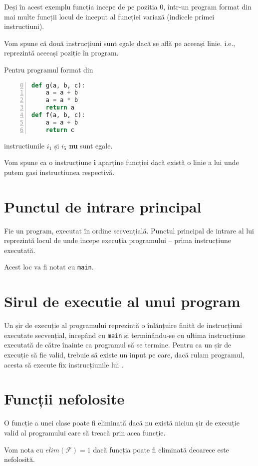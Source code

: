 Deși în acest exemplu funcția  incepe de pe pozitia 0,
într-un program format din mai multe funcții locul de inceput al
funcției variază (indicele primei instructiuni).

Vom spune că două instrucțiuni sunt egale dacă se află pe aceeași
linie. i.e., reprezintă aceeași poziție în program.

Pentru programul format din
\begin{lstlisting}[language=Python, numbers=left, firstnumber=0]
def g(a, b, c):
    a = a + b
    a = a * b
    return a
def f(a, b, c):
    a = a + b
    return c
\end{lstlisting}
instructiunile $i_1$ și $i_5$ \textbf{nu} sunt egale.

Vom spune ca o instrucțiune $\mathbf{i}$ aparține funcției
 dacă există o linie a lui  unde putem gasi
instructiunea respectivă.

\section{Punctul de intrare principal}

Fie  un program, executat în ordine secvențială.
Punctul principal de intrare al lui  reprezintă locul de
unde incepe execuția programului -- prima instrucțiune executată.

Acest loc va fi notat cu \texttt{main}.

\section{Sirul de executie al unui program}

Un șir de execuție  al programului  reprezintă o înlănțuire
finită de instrucțiuni executate secvențial, incepând cu
\texttt{main} si terminându-se cu ultima instrucțiune executată de
către  înainte ca programul să se termine.
Pentru ca un șir de execuție  să fie valid, trebuie să
existe un input pe care, dacă rulam programul, acesta să
execute fix instrucțiunile lui .

\section{Funcții nefolosite}

O funcție a unei clase poate fi eliminată dacă nu există niciun
șir de execuție valid al programului care să treacă prin acea
funcție.

Vom nota cu $elim(\mathcal{F}) = 1$ dacă funcția  poate fi
eliminată deoarece este nefolosită.

